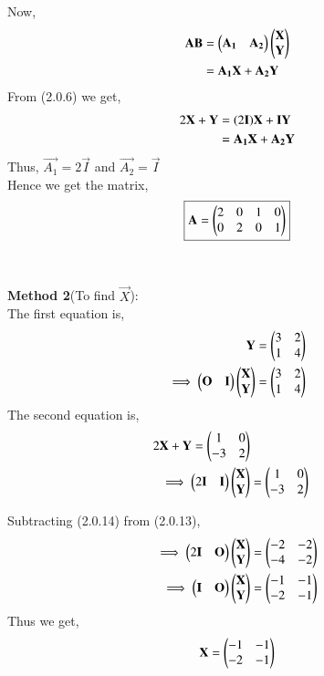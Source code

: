 \documentclass[journal,12pt,twocolumn]{IEEEtran}
\begin{document}
Now, 
\begin{align}
    \vec{A}\vec{B} &= \myvec{\vec{A_{1}}& \vec{A_{2}}}\myvec{\vec{X} \\ \vec{Y}}\notag\\
    &= \vec{A_{1}}\vec{X} + \vec{A_{2}}\vec{Y}
\end{align}
From (2.0.6) we get, 
\begin{align}
    2\vec{X}+\vec{Y} &= (2\vec{I})\vec{X} + \vec{I}\vec{Y}\notag\\
    &=\vec{A_{1}}\vec{X} + \vec{A_{2}}\vec{Y}
\end{align}
Thus, $\vec{A_{1}} = 2\vec{I}$ and $\vec{A_{2}} = \vec{I}$ \\
Hence we get the matrix, 
\begin{align*}
    \boxed{\vec{A} =  \myvec{2 & 0 & 1 & 0 \\ 0 & 2 & 0 & 1}}
\end{align*}\\~\\
\textbf{Method 2}(To find $\vec{X}$):  \\
The first equation is, 
\begin{align}
    \vec{Y} &= \myvec{ 3 & 2 \\ 1 & 4 }\notag\\
    \implies\myvec{\vec{O} & \vec{I}}\myvec{\vec{X} \\ \vec{Y}} &= \myvec{ 3 & 2 \\ 1 & 4 }
\end{align}
The second equation is, 
\begin{align}
    2\vec{X}+\vec{Y} = \myvec{1 & 0 \\ -3 & 2} \notag\\
    \implies\myvec{2\vec{I} & \vec{I}}\myvec{\vec{X} \\ \vec{Y}}
    &= \myvec{1 & 0 \\ -3 & 2}
\end{align}

Subtracting (2.0.14) from (2.0.13),
\begin{align}
    \implies\myvec{2\vec{I} & \vec{O}}\myvec{\vec{X} \\ \vec{Y}}
    &= \myvec{-2 & -2 \\ -4 & -2} \notag\\
    \implies\myvec{\vec{I} & \vec{O}}\myvec{\vec{X} \\ \vec{Y}}
    &= \myvec{-1 & -1 \\ -2 & -1}
    \end{align}
Thus we get,
\begin{align*}
    { \vec{X} = \myvec{-1 & -1 \\ -2 & -1} }
\end{align*}
\end{document}
